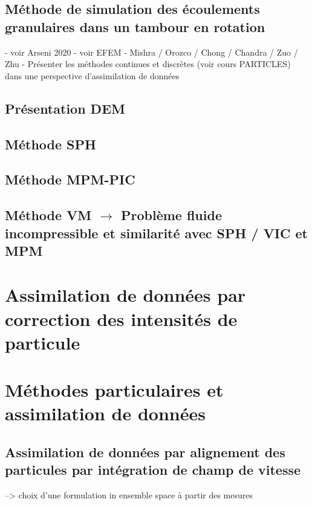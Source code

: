 \documentclass{article}
\begin{document}
\subsection{Méthode de simulation des écoulements granulaires dans un tambour en rotation}

- voir Arseni 2020
- voir EFEM
- Mishra / Orozco / Chong / Chandra / Zuo / Zhu
- Présenter les méthodes continues et discrètes (voir cours PARTICLES) dans une perspective d'assimilation de données

\subsection{Présentation DEM}

\subsection{Méthode SPH}
\subsection{Méthode MPM-PIC}
\subsection{Méthode VM $\rightarrow$ Problème fluide incompressible et similarité avec SPH / VIC et MPM}

\section{Assimilation de données par correction des intensités de particule}

\section{Méthodes particulaires et assimilation de données}


\subsection{Assimilation de données par alignement des particules par intégration de champ de vitesse}
--> choix d'une formulation in ensemble space à partir des mesures
\end{document}
